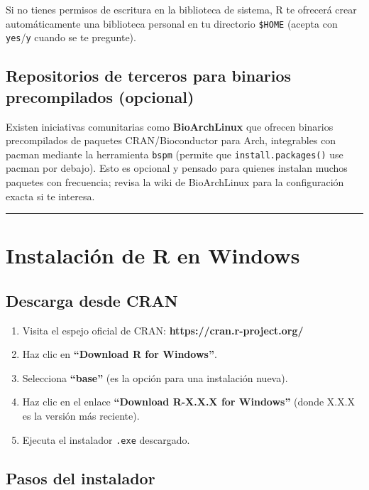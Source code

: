 \documentclass[
  man,
  floatsintext,
  longtable,
  a4paper,
  nolmodern,
  notxfonts,
  notimes,
  12pt,
  colorlinks=true,linkcolor=blue,citecolor=blue,urlcolor=blue]{apa7}
\providecommand{\tightlist}{%
  \setlength{\itemsep}{0pt}\setlength{\parskip}{0pt}}
\begin{document}
Si no tienes permisos de escritura en la biblioteca de sistema, R te
ofrecerá crear automáticamente una biblioteca personal en tu directorio
\texttt{\$HOME} (acepta con \texttt{yes}/\texttt{y} cuando se te
pregunte).

\subsection{Repositorios de terceros para binarios precompilados
(opcional)}\label{repositorios-de-terceros-para-binarios-precompilados-opcional}

Existen iniciativas comunitarias como \textbf{BioArchLinux} que ofrecen
binarios precompilados de paquetes CRAN/Bioconductor para Arch,
integrables con pacman mediante la herramienta \texttt{bspm} (permite
que \texttt{install.packages()} use pacman por debajo). Esto es opcional
y pensado para quienes instalan muchos paquetes con frecuencia; revisa
la wiki de BioArchLinux para la configuración exacta si te interesa.

\begin{center}\rule{0.5\linewidth}{0.5pt}\end{center}

\section{Instalación de R en
Windows}\label{instalaciuxf3n-de-r-en-windows}

\subsection{Descarga desde CRAN}\label{descarga-desde-cran}

\begin{enumerate}
\def\labelenumi{\arabic{enumi}.}
\tightlist
\item
  Visita el espejo oficial de CRAN: \textbf{https://cran.r-project.org/}
\item
  Haz clic en \textbf{``Download R for Windows''}.
\item
  Selecciona \textbf{``base''} (es la opción para una instalación
  nueva).
\item
  Haz clic en el enlace \textbf{``Download R-X.X.X for Windows''} (donde
  X.X.X es la versión más reciente).
\item
  Ejecuta el instalador \texttt{.exe} descargado.
\end{enumerate}

\subsection{Pasos del instalador}\label{pasos-del-instalador}
\end{document}
